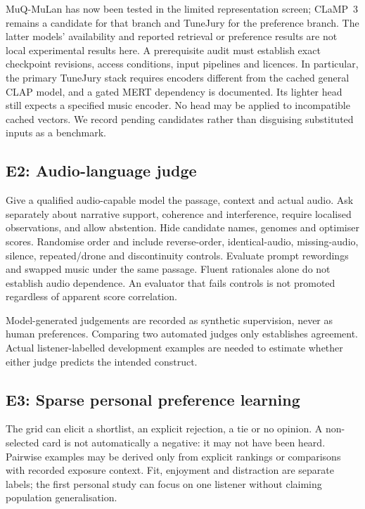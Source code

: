 \documentclass[11pt]{article}
\begin{document}
MuQ-MuLan has now been tested in the limited representation screen; CLaMP~3 remains a candidate for that branch and TuneJury for the preference branch. The latter models' availability and reported retrieval or preference results are not local experimental results here. A prerequisite audit must establish exact checkpoint revisions, access conditions, input pipelines and licences. In particular, the primary TuneJury stack requires encoders different from the cached general CLAP model, and a gated MERT dependency is documented. Its lighter head still expects a specified music encoder. No head may be applied to incompatible cached vectors. We record pending candidates rather than disguising substituted inputs as a benchmark.

\subsection{E2: Audio-language judge}
Give a qualified audio-capable model the passage, context and actual audio. Ask separately about narrative support, coherence and interference, require localised observations, and allow abstention. Hide candidate names, genomes and optimiser scores. Randomise order and include reverse-order, identical-audio, missing-audio, silence, repeated/drone and discontinuity controls. Evaluate prompt rewordings and swapped music under the same passage. Fluent rationales alone do not establish audio dependence. An evaluator that fails controls is not promoted regardless of apparent score correlation.

Model-generated judgements are recorded as synthetic supervision, never as human preferences. Comparing two automated judges only establishes agreement. Actual listener-labelled development examples are needed to estimate whether either judge predicts the intended construct.

\subsection{E3: Sparse personal preference learning}
The grid can elicit a shortlist, an explicit rejection, a tie or no opinion. A non-selected card is not automatically a negative: it may not have been heard. Pairwise examples may be derived only from explicit rankings or comparisons with recorded exposure context. Fit, enjoyment and distraction are separate labels; the first personal study can focus on one listener without claiming population generalisation.
\end{document}
